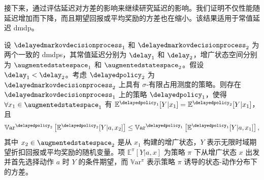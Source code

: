 接下来，通过评估延迟对方差的影响来继续研究延迟的影响。我们证明不仅性能随延迟增加而下降，而且期望回报或平均奖励的方差也在缩小。该结果适用于常值延迟 \gls{dmdp}。

\begin{prop}
\label{pp:var_ismmdp}
    设 $\delayedmarkovdecisionprocess_{1}$ 和 $\delayedmarkovdecisionprocess_{2}$ 为两个一致的 \glspl{dmdp}，其常值延迟分别为 $\delay_1$ 和 $\delay_2$，增广状态空间分别为 $\augmentedstatespace_1$ 和 $\augmentedstatespace_2$。假设 $\delay_1<\delay_2$。考虑 $\delayedpolicy_2$ 为 $\delayedmarkovdecisionprocess_{2}$ 上具有 $\sigma$-有限占用测度的策略。则存在 $\delayedmarkovdecisionprocess_{1}$ 上的策略 $\delayedpolicy_1$，使得 $\forall x_1\in\augmentedstatespace_1$ 有 $\mathbb{E}^{\delayedpolicy_1}[Y\vert x_1]=\mathbb{E}^{\delayedpolicy_2}[Y\vert x_1]$，且
    \begin{align*}
        \mathbb{V}\mathrm{ar}^{\delayedpolicy_2}\left[\mathbb{E}^{\delayedpolicy_2}[Y\vert a,x_2]\right]\le\mathbb{V}\mathrm{ar}^{\delayedpolicy_1}\left[\mathbb{E}^{\delayedpolicy_1}[Y\vert a,x_1]\right],
    \end{align*}
    其中 $x_2\in\augmentedstatespace_2$ 是从 $x_1$ 构建的增广状态，$Y$ 表示无限时域期望折扣回报或平均奖励的随机变量。项 $\mathbb{E}^{\pi}[Y\vert a,x]$ 为策略 $\pi$ 下从增广状态 $x$ 出发并首先选择动作 $a$ 时 $Y$ 的条件期望，而 $\mathbb{V}\mathrm{ar}^{\pi}$ 表示策略 $\pi$ 诱导的状态-动作分布下的方差。
\end{prop}
